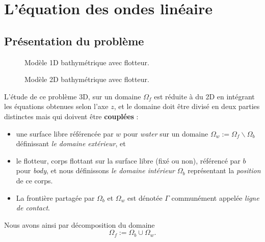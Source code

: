 \section{L'équation des ondes linéaire}
\subsection{Présentation du problème}

\begin{figure}[H]
	\centering
	\caption{Modèle 1D bathymétrique avec flotteur.}
	\label{fig:1dbathy}	
\end{figure}

\begin{figure}[H]
	\centering
	\caption{Modèle 2D bathymétrique avec flotteur.}
	\label{fig:2dbathy}
\end{figure}

\noindent L'étude de ce problème 3D, sur un domaine $\Omega_f$ est réduite à du 2D en intégrant les équations obtenues selon l'axe $z$, et le domaine doit être divisé en deux parties distinctes mais qui doivent être \textbf{couplées} : 
\begin{itemize}[label=$\mybullet$]
	\item une surface libre référencée par $w$ pour \textit{water} sur un domaine $\Omega_w := \Omega_f\backslash \Omega_b$ définissant \textit{le domaine extérieur}, et
	\item le flotteur, corps flottant sur la surface libre (fixé ou non), référencé par $b$ pour \textit{body}, et nous définissons \textit{le domaine intérieur} $\Omega_b$ représentant la \textit{position} de ce corps.
	\item La frontière partagée par $\Omega_b$ et $\Omega_w$ est dénotée $\Gamma$ communément appelée \textit{ligne de contact}.\\
\end{itemize}
Nous avons ainsi par décomposition du domaine \[\Omega_f := \Omega_b \cup \Omega_w.\]
